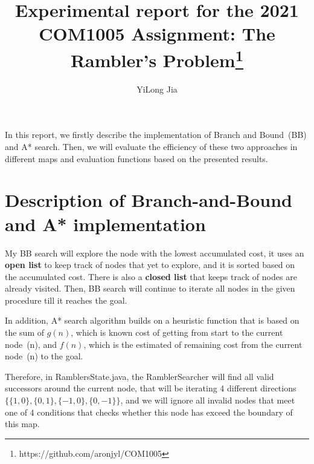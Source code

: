\documentclass[11pt,oneside]{article}
\title{Experimental report for the 2021 COM1005 Assignment: The Rambler's Problem\footnote{https://github.com/aronjyl/COM1005}}
\author{YiLong Jia}
\date{}
\begin{document}
\maketitle
In this report, we firstly describe the implementation of Branch and Bound~(BB) and A* search. Then, we will evaluate the efficiency of these two approaches in different maps and evaluation functions based on the presented results.

% 

\section{Description of Branch-and-Bound and A* implementation}
My BB search will explore the node with the lowest accumulated cost, it uses an \textbf{open list} to keep track of nodes that yet to explore, and it is sorted based on the accumulated cost. There is also a \textbf{closed list} that keeps track of nodes are already visited. Then, BB search will continue to iterate all nodes in the given procedure till it reaches the goal.%


In addition, A* search algorithm builds on a heuristic function that is based on the sum of $g(n)$, which is known cost of getting from start to the current node~(n), and $f(n)$, which is the estimated of remaining cost from the current node~(n) to the goal. %

Therefore, in RamblersState.java, the RamblerSearcher will find all valid successors around the current node, that will be iterating 4 different directions $\{\{1,0\},\{0,1\},\{-1,0\},\{0,-1\}\}$, and we will ignore all invalid nodes that meet one of 4 conditions that checks whether this node has exceed the boundary of this map.
\end{document}
